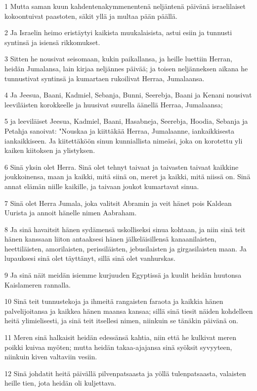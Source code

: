 \par 1 Mutta saman kuun kahdentenakymmenentenä neljäntenä päivänä israelilaiset kokoontuivat paastoten, säkit yllä ja multaa pään päällä.
\par 2 Ja Israelin heimo eristäytyi kaikista muukalaisista, astui esiin ja tunnusti syntinsä ja isiensä rikkomukset.
\par 3 Sitten he nousivat seisomaan, kukin paikallansa, ja heille luettiin Herran, heidän Jumalansa, lain kirjaa neljännes päivää; ja toisen neljänneksen aikana he tunnustivat syntinsä ja kumartaen rukoilivat Herraa, Jumalaansa.
\par 4 Ja Jeesua, Baani, Kadmiel, Sebanja, Bunni, Seerebja, Baani ja Kenani nousivat leeviläisten korokkeelle ja huusivat suurella äänellä Herraa, Jumalaansa;
\par 5 ja leeviläiset Jeesua, Kadmiel, Baani, Hasabneja, Seerebja, Hoodia, Sebanja ja Petahja sanoivat: "Nouskaa ja kiittäkää Herraa, Jumalaanne, iankaikkisesta iankaikkiseen. Ja kiitettäköön sinun kunniallista nimeäsi, joka on korotettu yli kaiken kiitoksen ja ylistyksen.
\par 6 Sinä yksin olet Herra. Sinä olet tehnyt taivaat ja taivasten taivaat kaikkine joukkoinensa, maan ja kaikki, mitä siinä on, meret ja kaikki, mitä niissä on. Sinä annat elämän niille kaikille, ja taivaan joukot kumartavat sinua.
\par 7 Sinä olet Herra Jumala, joka valitsit Abramin ja veit hänet pois Kaldean Uurista ja annoit hänelle nimen Aabraham.
\par 8 Ja sinä havaitsit hänen sydämensä uskolliseksi sinua kohtaan, ja niin sinä teit hänen kanssaan liiton antaaksesi hänen jälkeläisillensä kanaanilaisten, heettiläisten, amorilaisten, perissiläisten, jebusilaisten ja girgasilaisten maan. Ja lupauksesi sinä olet täyttänyt, sillä sinä olet vanhurskas.
\par 9 Ja sinä näit meidän isiemme kurjuuden Egyptissä ja kuulit heidän huutonsa Kaislameren rannalla.
\par 10 Sinä teit tunnustekoja ja ihmeitä rangaisten faraota ja kaikkia hänen palvelijoitansa ja kaikkea hänen maansa kansaa; sillä sinä tiesit näiden kohdelleen heitä ylimielisesti, ja sinä teit itsellesi nimen, niinkuin se tänäkin päivänä on.
\par 11 Meren sinä halkaisit heidän edessänsä kahtia, niin että he kulkivat meren poikki kuivaa myöten; mutta heidän takaa-ajajansa sinä syöksit syvyyteen, niinkuin kiven valtaviin vesiin.
\par 12 Sinä johdatit heitä päivällä pilvenpatsaasta ja yöllä tulenpatsaasta, valaisten heille tien, jota heidän oli kuljettava.
